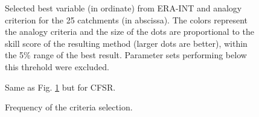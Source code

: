 \documentclass[draft]{agujournal2019}
\begin{document}
\begin{figure}[hbt]
	\noindent{}
	\caption{Selected best variable (in ordinate) from ERA-INT and analogy criterion for the 25 catchments (in abscissa). The colors represent the analogy criteria and the size of the dots are proportional to the skill score of the resulting method (larger dots are better), within the 5\% range of the best result. Parameter sets performing below this threhold were excluded.}
	\label{fig_best_era_int}
\end{figure}

\begin{figure}[hbt]
	\noindent{}
	\caption{Same as Fig. \ref{fig_best_era_int} but for CFSR.}
	\label{fig_best_cfsr}
\end{figure}

\begin{figure}[hbt]
	\noindent{}
	\caption{Frequency of the criteria selection.}
	\label{fig_criteria}
\end{figure}
\end{document}
